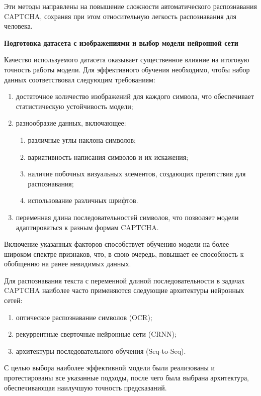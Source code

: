 Эти методы направлены на повышение сложности автоматического распознавания 
CAPTCHA, сохраняя при этом относительную легкость распознавания для человека. 

\textbf{Подготовка датасета с изображениями и выбор модели нейронной сети}

Качество используемого датасета оказывает существенное влияние на итоговую 
точность работы модели. Для эффективного обучения необходимо, чтобы набор данных 
соответствовал следующим требованиям:

\begin{enumerate}
    \item достаточное количество изображений для каждого символа, что 
    обеспечивает статистическую устойчивость модели;
    \item разнообразие данных, включающее:
    \begin{enumerate}
        \item различные углы наклона символов;
        \item вариативность написания символов и их искажения;
        \item наличие побочных визуальных элементов, создающих препятствия для 
        распознавания;
        \item использование различных шрифтов.
    \end{enumerate}
    \item переменная длина последовательностей символов, что позволяет модели 
    адаптироваться к разным формам CAPTCHA.
\end{enumerate}

Включение указанных факторов способствует обучению модели на более широком 
спектре признаков, что, в свою очередь, повышает ее способность к обобщению на 
ранее невидимых данных.

Для распознавания текста с переменной длиной последовательности в задачах CAPTCHA 
наиболее часто применяются следующие архитектуры нейронных сетей:

\begin{enumerate}
    \item оптическое распознавание символов (OCR);
    \item рекуррентные сверточные нейронные сети (CRNN);
    \item архитектуры последовательного обучения (Seq-to-Seq).
\end{enumerate}

С целью выбора наиболее эффективной модели были реализованы и протестированы все 
указанные подходы, после чего была выбрана архитектура, обеспечивающая наилучшую 
точность предсказаний.

